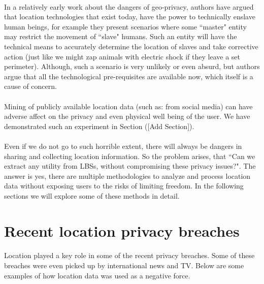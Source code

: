 \documentclass[12pt]{report}
\theoremstyle{named}
\begin{document}
\paragraph{}
In a relatively early work \cite{dobson2003geoslavery} about the dangers of geo-privacy, authors have argued that location technologies that exist today, have the power to technically enslave human beings, for example they present scenarios where some ``master" entity may restrict the movement of ``slave" humans. Such an entity will have the technical means to accurately determine the location of slaves and take corrective action (just like we might zap animals with electric shock if they leave a set perimeter). Although, such a scenario is very unlikely or even absurd, but authors argue that all the technological pre-requisites are available now, which itself is a cause of concern.

\paragraph{}
Mining of publicly available location data (such as: from social media) can have adverse affect on the privacy and even physical well being of the user. We have demonstrated such an experiment in Section ([Add Section]). 



\paragraph{}
Even if we do not go to such horrible extent, there will always be dangers in sharing and collecting location information. So the problem arises, that ``Can we extract any utility from LBSs, without compromising these privacy issues?". The answer is yes, there are multiple methodologies to analyze and process location data without exposing users to the risks of limiting freedom.  In the following sections we will explore some of these methods in detail.

\section{Recent location privacy breaches}
\paragraph{}
Location played a key role in some of the recent privacy breaches. Some of these breaches were even picked up by international news and TV. Below are some examples of how location data was used as a negative force.
\end{document}
